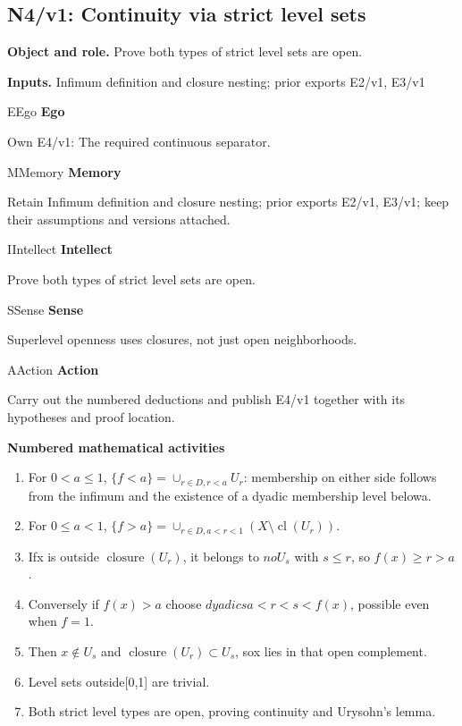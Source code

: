 \documentclass[preprint,12pt,aps,pra,showkeys,amsmath,amssymb,superscriptaddress,floatfix]{revtex4-2}
\theoremstyle{definition}
\theoremstyle{remark}
\newcommand{\mmfaculty}[3]{%
 \begin{mmfacultybox}{#1}{#2}
 {\sffamily\bfseries\color{MMBlue}#2}\par\smallskip #3
 \end{mmfacultybox}}
\newcommand{\field}[2]{\par\smallskip\noindent\textbf{#1.} #2\par}
\begin{document}
\clearpage

\subsection{N4/v1: Continuity via strict level sets}

\field{Object and role}{Prove both types of strict level sets are open.}

\field{Inputs}{Infimum definition and closure nesting; prior exports E2/v1, E3/v1}

\mmfaculty{E}{Ego}{Own E4/v1: The required continuous separator.}

\mmfaculty{M}{Memory}{Retain Infimum definition and closure nesting; prior exports E2/v1,
E3/v1; keep their assumptions and versions attached.}

\mmfaculty{I}{Intellect}{Prove both types of strict level sets are open.}

\mmfaculty{S}{Sense}{Superlevel openness uses closures, not just open neighborhoods.}

\mmfaculty{A}{Action}{Carry out the numbered deductions and publish E4/v1 together with its
hypotheses and proof location.}

\smallskip\noindent\textbf{Numbered mathematical activities}

\begin{enumerate}[label=N4.\arabic*,leftmargin=3.4em]

\item For \(0<a\le 1\), \(\{f<a\}=\cup _{r\in D,r<a}U_r\): membership on
either side follows from the infimum and the existence of a dyadic
membership level belowa.

\item For \(0\le a<1\),
\(\{f>a\}=\cup _{r\in D,a<r<1}(X\setminus\operatorname{cl}(U_r))\).

\item Ifx is outside \(\operatorname{closure} (U_r)\), it belongs to \(noU_s\)
with \(s\le r\), so \(f(x)\ge r>a\).

\item Conversely if \(f(x)>a\) choose \(dyadicsa<r<s<f(x)\), possible even
when \(f=1\).

\item Then \(x\notin U_s\) and \(\operatorname{closure} (U_r)\subset U_s\),
sox lies in that open complement.

\item Level sets outside{[}0,1{]} are trivial.

\item Both strict level types are open, proving continuity and Urysohn's
lemma.

\end{enumerate}
\end{document}
